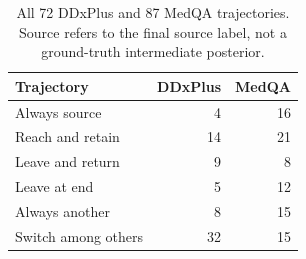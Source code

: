 \begin{table}[H]\centering\small
\begin{tabular}{lrr}\toprule
Trajectory & DDxPlus & MedQA\\\midrule
Always source & 4 & 16\\
Reach and retain & 14 & 21\\
Leave and return & 9 & 8\\
Leave at end & 5 & 12\\
Always another & 8 & 15\\
Switch among others & 32 & 15\\
\bottomrule\end{tabular}
\caption{All 72 DDxPlus and 87 MedQA trajectories. Source refers to the final source label, not a ground-truth intermediate posterior.}\end{table}
